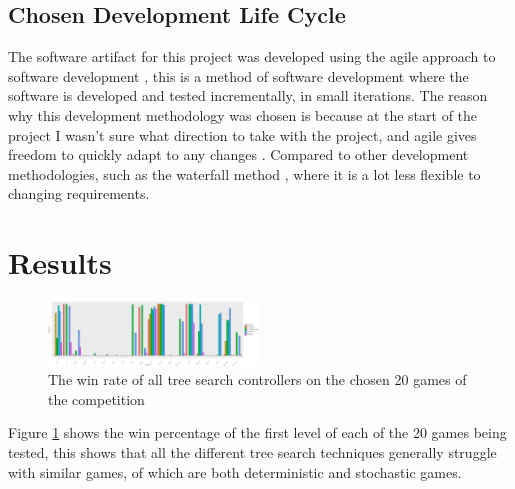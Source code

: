 \documentclass[journal]{IEEEtran}
\begin{document}
		
	\subsection{Chosen Development Life Cycle}
		The software artifact for this project was developed using the agile approach to software development \cite{beck2001manifesto, cockburn2001agile, dybaa2008empirical}, this is a method of software development where the software is developed and tested incrementally, in small iterations. The reason why this development methodology was chosen is because at the start of the project I wasn't sure what direction to take with the project, and agile gives freedom to quickly adapt to any changes \cite{cockburn2001agile, boehm1988spiral}. Compared to other development methodologies, such as the waterfall method \cite{balaji2012waterfall}, where it is a lot less flexible to changing requirements.






\section{Results}
		\begin{figure}[h]
		    \centering
		    \includegraphics[width=0.5\textwidth]{allGameBarPlot}
		    \caption{ The win rate of all tree search controllers on the chosen 20 games of the competition}
		    \label{fig:allGameBarPlot}
		\end{figure}



		Figure \ref{fig:allGameBarPlot} shows the win percentage of the first level of each of the 20 games being tested, this shows that all the different tree search techniques generally struggle with similar games, of which are both deterministic and stochastic games.
\end{document}
